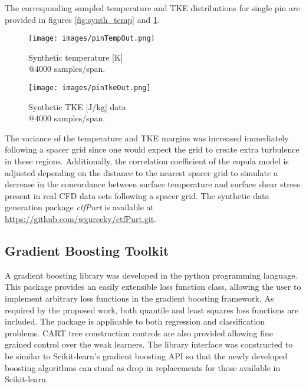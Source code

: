 The corresponding sampled temperature and TKE distributions for single pin are provided in figures \ref{fig:synth_temp} and \ref{fig:synth_tke}. \\

\begin{figure}[!htbp]
\centering
\begin{minipage}{.45\textwidth}
  \texttt{[image: images/pinTempOut.png]}
\caption{Synthetic temperature [K] \\
         $@4000$ samples/span.}
\label{fig:synth_temp}
\end{minipage}%
\begin{minipage}{.45\textwidth}
  \texttt{[image: images/pinTkeOut.png]}
\caption{Synthetic TKE [J/kg] data \\
         $@4000$ samples/span.}
\label{fig:synth_tke}
\end{minipage}
\end{figure}

The variance of the temperature and TKE margins was increased immediately following a spacer grid since one would expect the grid to create extra turbulence in these regions.  Additionally, the correlation coefficient of the copula model is adjusted depending on the distance to the nearest spacer grid to simulate a decrease in the concordance between surface temperature and surface shear stress present in real CFD data sets following a spacer grid. 
The synthetic data generation package \emph{ctfPurt} is available at \url{https://github.com/wgurecky/ctfPurt.git}.

\subsection{Gradient Boosting Toolkit}

A gradient boosting library was developed in the python programming language.  This package provides an easily extensible loss function class, allowing the user to implement arbitrary loss functions in the gradient boosting framework.  As required by the proposed work, both quantile and least squares loss functions are included.  The package is applicable to both regression and classification problems.  CART tree construction controls are also provided allowing fine grained control over the weak learners.
The library interface was constructed to be similar to Scikit-learn's gradient boosting API so that the newly developed boosting algorithms can stand as drop in replacements for those available in Scikit-learn.

